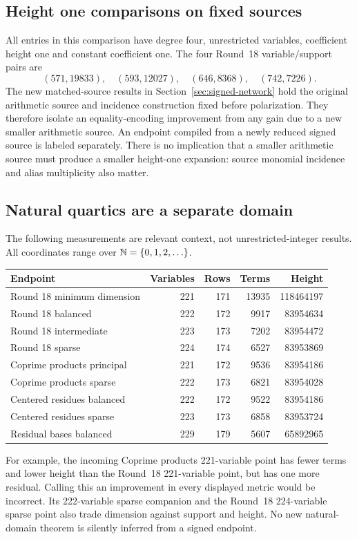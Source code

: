 \subsection{Height one comparisons on fixed sources}
All entries in this comparison have degree four, unrestricted variables,
coefficient height one and constant coefficient one. The four Round~18
variable/support pairs are
\[
 (571,19833),\quad(593,12027),\quad(646,8368),\quad(742,7226).
\]
The new matched-source results in Section~\ref{sec:signed-network} hold
the original arithmetic source and incidence construction fixed before
polarization. They therefore isolate an equality-encoding improvement from
any gain due to a new smaller arithmetic source. An endpoint compiled from
a newly reduced signed source is labeled separately. There is no implication
that a smaller arithmetic source must produce a smaller height-one expansion:
source monomial incidence and alias multiplicity also matter.

\subsection{Natural quartics are a separate domain}
The following measurements are relevant context, not unrestricted-integer
results. All coordinates range over $\mathbb N=\{0,1,2,\ldots\}$.
\begin{center}\small
\begin{tabular}{@{}lrrrr@{}}\toprule
Endpoint & Variables & Rows & Terms & Height\\\midrule
Round 18 minimum dimension &221&171&13935&118464197\\
Round 18 balanced &222&172&9917&83954634\\
Round 18 intermediate &223&173&7202&83954472\\
Round 18 sparse &224&174&6527&83953869\\\midrule
Coprime products principal &221&172&9536&83954186\\
Coprime products sparse &222&173&6821&83954028\\
Centered residues balanced &222&172&9522&83954186\\
Centered residues sparse &223&173&6858&83953724\\
Residual bases balanced &229&179&5607&65892965\\\bottomrule
\end{tabular}
\end{center}
For example, the incoming Coprime products 221-variable point has fewer
terms and lower height than the Round~18 221-variable point, but has one
more residual. Calling this an improvement in every displayed metric would
be incorrect. Its 222-variable sparse companion and the Round~18
224-variable sparse point also trade dimension against support and height.
No new natural-domain theorem is silently inferred from a signed endpoint.

